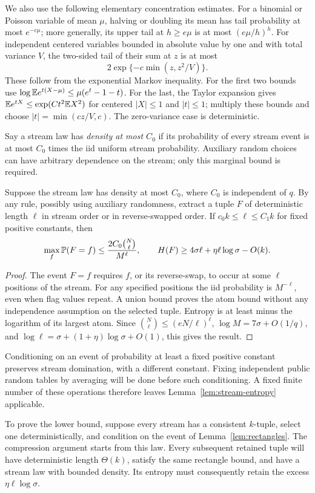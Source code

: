 We also use the following elementary concentration estimates.
For a binomial or Poisson variable of mean \(\mu\), halving or
doubling its mean has tail probability at most \(e^{-c\mu}\);
more generally, its upper tail at \(h\ge e\mu\) is at most
\((e\mu/h)^h\). For independent centered variables bounded in
absolute value by one and with total variance \(V\), the two-sided
tail of their sum at \(z\) is at most
\[
 2\exp\{-c\min(z,z^2/V)\}.
\]
These follow from the exponential Markov inequality. For the first
two bounds use
\(\log\mathbb E e^{t(X-\mu)}\le\mu(e^t-1-t)\).
For the last, the Taylor expansion gives
\(\mathbb E e^{tX}\le\exp(Ct^2\mathbb E X^2)\) for centered \(|X|\le1\)
and \(|t|\le1\); multiply these bounds and choose
\(|t|=\min(cz/V,c)\). The zero-variance case is deterministic.

Say a stream law has \emph{density at most \(C_0\)} if its probability
of every stream event is at most \(C_0\) times the iid uniform
stream probability. Auxiliary random choices can have arbitrary
dependence on the stream; only this marginal bound is required.

\begin{lemma}
\label{lem:stream-entropy}
Suppose the stream law has density at most \(C_0\), where \(C_0\)
is independent of \(q\). By any rule, possibly using auxiliary
randomness, extract a tuple \(F\) of deterministic length \(\ell\)
in stream order or in reverse-swapped order. If
\(c_0k\le\ell\le C_1k\) for fixed positive constants, then
\[
 \max_f\mathbb P(F=f)\le
 \frac{2C_0\binom N\ell}{M^\ell},
 \qquad
 H(F)\ge4\sigma\ell+\eta\ell\log\sigma-O(k).
\]
\end{lemma}
\begin{proof}
The event \(F=f\) requires \(f\), or its reverse-swap, to occur at
some \(\ell\) positions of the stream. For any specified positions
the iid probability is \(M^{-\ell}\), even when flag values repeat.
A union bound proves the atom bound without any independence
assumption on the selected tuple. Entropy is at least minus the
logarithm of its largest atom. Since
\(\binom N\ell\le(eN/\ell)^\ell\),
\(\log M=7\sigma+O(1/q)\), and
\(\log\ell=\sigma+(1+\eta)\log\sigma+O(1)\), this gives the result.
\end{proof}

Conditioning on an event of probability at least a fixed positive
constant preserves stream domination, with a different constant.
Fixing independent public random tables by averaging will be done
before such conditioning. A fixed finite number of these operations
therefore leaves Lemma~\ref{lem:stream-entropy} applicable.

To prove the lower bound, suppose every stream has a consistent
\(k\)-tuple, select one deterministically, and condition on the event
of Lemma~\ref{lem:rectangles}. The compression argument starts from
this law. Every subsequent retained tuple will have deterministic
length \(\Theta(k)\), satisfy the same rectangle bound, and have a
stream law with bounded density. Its entropy must consequently
retain the excess \(\eta\ell\log\sigma\).
